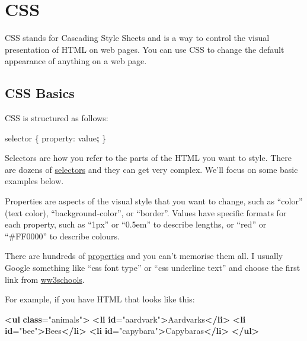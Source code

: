 \documentclass[
]{book}
\newenvironment{Shaded}{\begin{snugshade}}{\end{snugshade}}
\newcommand{\ErrorTok}[1]{\textcolor[rgb]{0.64,0.00,0.00}{\textbf{#1}}}
\newcommand{\KeywordTok}[1]{\textcolor[rgb]{0.13,0.29,0.53}{\textbf{#1}}}
\newcommand{\NormalTok}[1]{#1}
\newcommand{\OperatorTok}[1]{\textcolor[rgb]{0.81,0.36,0.00}{\textbf{#1}}}
\newcommand{\OtherTok}[1]{\textcolor[rgb]{0.56,0.35,0.01}{#1}}
\newcommand{\StringTok}[1]{\textcolor[rgb]{0.31,0.60,0.02}{#1}}
\begin{document}
\hypertarget{css}{%
\section{CSS}\label{css}}

CSS stands for Cascading Style Sheets and is a way to control the visual presentation of HTML on web pages. You can use CSS to change the default appearance of anything on a web page.

\hypertarget{css-basics}{%
\subsection{CSS Basics}\label{css-basics}}

CSS is structured as follows:

\begin{Shaded}
\begin{Highlighting}[]
\NormalTok{selector \{ property: value}\OperatorTok{;}\NormalTok{ \}}
\end{Highlighting}
\end{Shaded}

Selectors are how you refer to the parts of the HTML you want to style. There are dozens of \href{https://www.w3schools.com/cssref/css_selectors.asp}{selectors} and they can get very complex. We'll focus on some basic examples below.

Properties are aspects of the visual style that you want to change, such as ``color'' (text color), ``background-color'', or ``border''. Values have specific formats for each property, such as ``1px'' or ``0.5em'' to describe lengths, or ``red'' or ``\#FF0000'' to describe colours.

There are hundreds of \href{https://www.w3schools.com/cssref/default.asp}{properties} and you can't memorise them all. I usually Google something like ``css font type'' or ``css underline text'' and choose the first link from \href{https://www.w3schools.com}{ww3schools}.

For example, if you have HTML that looks like this:

\begin{Shaded}
\begin{Highlighting}[]
\KeywordTok{\textless{}ul} \ErrorTok{class}\OtherTok{=}\StringTok{"animals"}\KeywordTok{\textgreater{}}
    \KeywordTok{\textless{}li} \ErrorTok{id}\OtherTok{=}\StringTok{"aardvark"}\KeywordTok{\textgreater{}}\NormalTok{Aardvarks}\KeywordTok{\textless{}/li\textgreater{}}
    \KeywordTok{\textless{}li} \ErrorTok{id}\OtherTok{=}\StringTok{"bee"}\KeywordTok{\textgreater{}}\NormalTok{Bees}\KeywordTok{\textless{}/li\textgreater{}}
    \KeywordTok{\textless{}li} \ErrorTok{id}\OtherTok{=}\StringTok{"capybara"}\KeywordTok{\textgreater{}}\NormalTok{Capybaras}\KeywordTok{\textless{}/li\textgreater{}}
\KeywordTok{\textless{}/ul\textgreater{}}
\end{Highlighting}
\end{Shaded}
\end{document}
